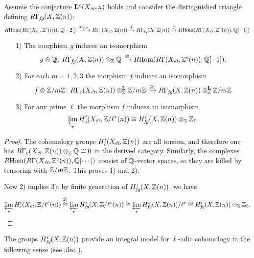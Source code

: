 \documentclass{article}
\numberwithin{equation}{section}
\begin{document}
\begin{proposition}
  \label{prop:tensoring-RGammafg-with-Z/m-and-Q}
  Assume the conjecture $\mathbf{L}^c (X_\et,n)$ holds and consider the
  distinguished triangle defining $R\Gamma_\fg (X, \ZZ (n))$:
  \[ \RHom (R\Gamma (X_\et, \ZZ^c (n)), \QQ [-2]) \xrightarrow{\alpha_{X,n}}
     R\Gamma_c (X_\et, \ZZ (n)) \xrightarrow{f}
     R\Gamma_\fg (X, \ZZ (n)) \xrightarrow{g}
     \RHom (R\Gamma (X_\et, \ZZ^c (n)), \QQ [-1]) \]

  \begin{enumerate}
  \item[1)] The morphism $g$ induces an isomorphism
    \[ g\otimes \QQ\colon R\Gamma_\fg (X, \ZZ (n)) \otimes_\ZZ \QQ \xrightarrow{\cong}
       \RHom (R\Gamma (X_\et, \ZZ^c (n)), \QQ [-1]).\]

  \item[2)] For each $m = 1,2,3$ the morphism $f$ induces an isomorphism
    \[ f\otimes \ZZ/m\ZZ\colon
       R\Gamma_c (X_\et, \ZZ (n))\otimes_\ZZ^\mathbf{L} \ZZ/m\ZZ \xrightarrow{\cong}
       R\Gamma_\fg (X, \ZZ (n))\otimes_\ZZ^\mathbf{L} \ZZ/m\ZZ \]
    
  \item[3)] For any prime $\ell$ the morphism $f$ induces an isomorphism
    $$\varprojlim_r H_c^i (X_\et, \ZZ/\ell^r (n)) \cong H_\fg^i (X, \ZZ (n)) \otimes_\ZZ \ZZ_\ell.$$
  \end{enumerate}
  
  \begin{proof}
    The cohomology groups $H_c^i (X_\et, \ZZ (n))$ are all torsion, and
    therefore one has $R\Gamma_c (X_\et, \ZZ (n)) \otimes_\ZZ \QQ \cong 0$ in
    the derived category. Similarly, the complexes
    $\RHom (R\Gamma (X_\et, \ZZ^c (n)), \QQ [\cdots])$ consist of $\QQ$-vector
    spaces, so they are killed by tensoring with $\ZZ/m\ZZ$.
    This proves 1) and 2).

    Now 2) implies 3): by finite generation of $H_\fg^i (X, \ZZ (n))$, we have
    \[ \varprojlim_r H_c^i (X_\et, \ZZ/\ell^r (n)) \stackrel{\text{2)}}{\cong}
      \varprojlim_r H_\fg^i (X, \ZZ/\ell^r (n)) \cong
      \varprojlim_r H_\fg^i (X, \ZZ (n))/\ell^r \cong
      H_\fg^i (X, \ZZ (n)) \otimes_\ZZ \ZZ_\ell. \qedhere \]
  \end{proof}
\end{proposition}

The groups $H_\fg^i (X, \ZZ (n))$ provide an integral model for $\ell$-adic
cohomology in the following sense (see also \cite[\S 8]{Geisser-2004}).
\end{document}
